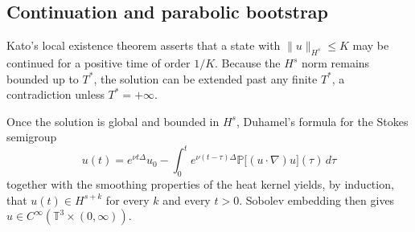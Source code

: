 \documentclass[11pt,a4paper]{article}
\begin{document}
\subsection{Continuation and parabolic bootstrap}
Kato's local existence theorem asserts that a state with \(\|u\|_{H^s}\le K\) may be continued for a positive time of order \(1/K\). Because the \(H^s\) norm remains bounded up to \(T^*\), the solution can be extended past any finite \(T^*\), a contradiction unless \(T^*=+\infty\).

Once the solution is global and bounded in \(H^s\), Duhamel's formula for the Stokes semigroup
\[
u(t)=e^{\nu t\Delta}u_0-\int_0^t e^{\nu(t-\tau)\Delta}\mathbb{P}\bigl[(u\cdot\nabla)u\bigr](\tau)\,d\tau
\]
together with the smoothing properties of the heat kernel yields, by induction, that \(u(t)\in H^{s+k}\) for every \(k\) and every \(t>0\). Sobolev embedding then gives \(u\in C^\infty(\mathbb{T}^3\times(0,\infty))\).
\end{document}
